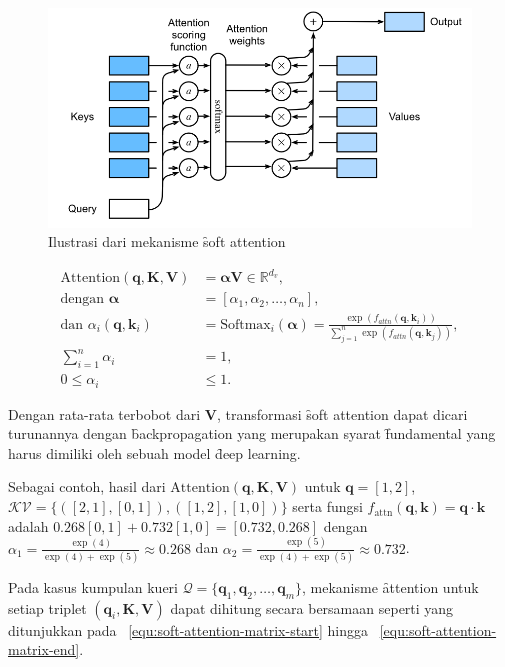 	\begin{figure}
		\centering
		\includegraphics[width=1\textwidth]{assets/pics/softattention.png}
		\caption{Ilustrasi dari mekanisme \f{soft attention} \citep{zhang2023dive}}
		\label{fig:soft-attention}
	\end{figure}

	\begin{align}
		\label{equ:soft-attention-start}
		\text{Attention}(\mathbf{q}, \mathbf{K}, \mathbf{V}) &= \mathbf{\alpha}\mathbf{V} \in \mathbb{R}^{d_v},\\
		\text{dengan } \bm{\alpha} &= [\alpha_{1}, \alpha_{2}, \dots, \alpha_{n}], \\
		\text{dan } \alpha_{i}(\mathbf{q},\mathbf{k}_i) &= \text{Softmax}_i(\bm{\alpha}) = \frac{\exp(f_{attn}(\mathbf{q}, \mathbf{k}_i))}{\sum_{j=1}^{n} \exp(f_{attn}(\mathbf{q}, \mathbf{k}_j))}, \\
		\sum_{i=1}^{n} \alpha_{i} &= 1, \\
		\label{equ:soft-attention-end}
		0 \leq \alpha_{i} &\leq 1.
	\end{align}

	Dengan rata-rata terbobot dari $\mathbf{V}$, transformasi \f{soft attention} dapat dicari turunannya dengan \f{backpropagation} yang merupakan syarat \f{fundamental} yang harus dimiliki oleh sebuah model \f{deep learning}.

	Sebagai contoh, hasil dari $\text{Attention}(\mathbf{q}, \mathbf{K}, \mathbf{V})$ untuk $\mathbf{q}= [1,2]$, $\mathcal{KV} = \{([2,1],[0,1]), ([1,2],[1,0])\}$ serta fungsi $f_\text{attn}(\mathbf{q}, \mathbf{k}) =\mathbf{q}\cdot \mathbf{k}$ adalah $0.268 [0,1] + 0.732 [1,0] = [0.732, 0.268]$ dengan $\alpha_1 = \frac{\exp(4)}{\exp(4) + \exp(5)} \approx 0.268$ dan $\alpha_2 = \frac{\exp(5)}{\exp(4) + \exp(5)} \approx 0.732$.

	Pada kasus kumpulan kueri $\mathcal{Q} = \{\mathbf{q}_1, \mathbf{q}_2, \dots, \mathbf{q}_m\}$, mekanisme \f{attention} untuk setiap triplet $(\mathbf{q}_i, \mathbf{K}, \mathbf{V})$ dapat dihitung secara bersamaan seperti yang ditunjukkan pada \equ~\ref{equ:soft-attention-matrix-start} hingga \equ~\ref{equ:soft-attention-matrix-end}.

